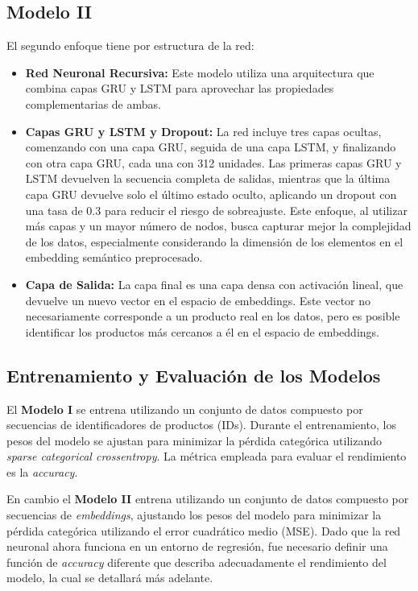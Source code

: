 \documentclass[runningheads]{llncs}
\begin{document}
	\subsection{Modelo II}
	El segundo enfoque tiene por estructura de la red:
	\begin{itemize}
		\item \textbf{Red Neuronal Recursiva:} Este modelo utiliza una arquitectura que combina capas GRU y LSTM para aprovechar las propiedades complementarias de ambas.
		
		\item \textbf{Capas GRU y LSTM y Dropout:} La red incluye tres capas ocultas, comenzando con una capa GRU, seguida de una capa LSTM, y finalizando con otra capa GRU, cada una con 312 unidades. Las primeras capas GRU y LSTM devuelven la secuencia completa de salidas, mientras que la última capa GRU devuelve solo el último estado oculto, aplicando un dropout con una tasa de $0.3$ para reducir el riesgo de sobreajuste. Este enfoque, al utilizar más capas y un mayor número de nodos, busca capturar mejor la complejidad de los datos, especialmente considerando la dimensión de los elementos en el embedding semántico preprocesado.
		
		\item \textbf{Capa de Salida:} La capa final es una capa densa con activación lineal, que devuelve un nuevo vector en el espacio de embeddings. Este vector no necesariamente corresponde a un producto real en los datos, pero es posible identificar los productos más cercanos a él en el espacio de embeddings.
	\end{itemize}

\subsection{Entrenamiento y Evaluación de los Modelos}

	El \textbf{Modelo I} se entrena utilizando un conjunto de datos compuesto por secuencias de identificadores de productos (IDs). Durante el entrenamiento, los pesos del modelo se ajustan para minimizar la pérdida categórica utilizando \textit{sparse categorical crossentropy}. La métrica empleada para evaluar el rendimiento es la \textit{accuracy}.

	En cambio el \textbf{Modelo II} entrena utilizando un conjunto de datos compuesto por secuencias de \textit{embeddings}, ajustando los pesos del modelo para minimizar la pérdida categórica utilizando el error cuadrático medio (MSE). Dado que la red neuronal ahora funciona en un entorno de regresión, fue necesario definir una función de \textit{accuracy} diferente que describa adecuadamente el rendimiento del modelo, la cual se detallará más adelante.
    
\end{document}
